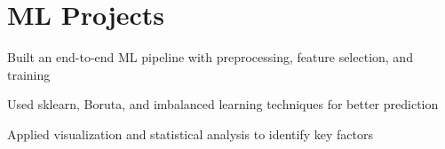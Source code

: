 \documentclass[]{deedy-resume-openfont}
\begin{document}
\begin{minipage}[t]{0.64\textwidth}

\section{ML Projects}

\begin{tightemize}
\item Built an end-to-end ML pipeline with preprocessing, feature selection, and training
\item Used sklearn, Boruta, and imbalanced learning techniques for better prediction
\item Applied visualization and statistical analysis to identify key factors
\end{tightemize}
\sectionsep


\end{minipage}
\end{document}
